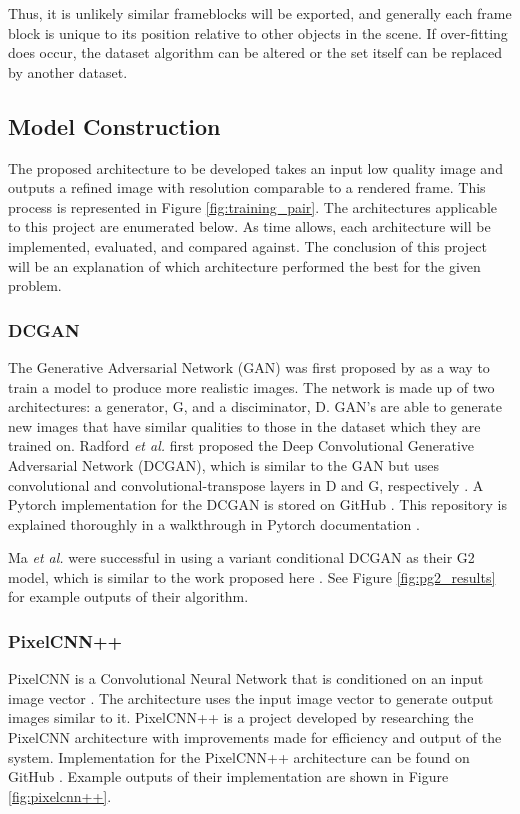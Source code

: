 \documentclass[letterpaper]{article} %
\begin{document}
Thus, it is unlikely similar frameblocks will be exported,
and generally each frame block is unique to its position relative to other objects in the scene.
If over-fitting does occur,
the dataset algorithm can be altered or the set itself can be replaced by another dataset.

\subsection{Model Construction}
\label{subsec:model}
The proposed architecture to be developed takes an input low quality image and outputs
a refined image with resolution comparable to a rendered frame.
This process is represented in Figure \ref{fig:training_pair}.
The architectures applicable to this project are enumerated below.
As time allows, each architecture will be implemented, evaluated, and compared
against. The conclusion of this project will be an explanation of which architecture performed the best
for the given problem.

\subsubsection{DCGAN}
The Generative Adversarial Network (GAN) was first proposed by
\cite{generative_adversarial_networks}
as a way to
train a model to produce more realistic images. The network is made up of two architectures:
a generator, G, and a disciminator, D.
GAN's are able to generate new images that have similar qualities to
those in the dataset which they are trained on.
Radford \textit{et al.} first proposed the Deep Convolutional Generative Adversarial Network (DCGAN),
which is similar to the GAN
but uses convolutional and convolutional-transpose layers in D and G, respectively
\cite{unsupervised_learning}.
A Pytorch implementation for the DCGAN is stored on GitHub
\cite{dcgan_git}. This repository is explained thoroughly in a walkthrough
in Pytorch documentation \cite{dcgan_example}.

Ma \textit{et al.} were successful in using
a variant conditional DCGAN as their G2 model, which is similar to the work proposed here
\cite{pose_guided_image_generation}.
See Figure \ref{fig:pg2_results} for example outputs of their algorithm.

\subsubsection{PixelCNN++}
PixelCNN is a Convolutional Neural Network that is conditioned on an input image vector
\cite{conditional_image_generation}.
The architecture uses the input image vector to generate output images similar to it.
PixelCNN++ \cite{pixelcnn++} is a project developed by researching the
PixelCNN architecture with improvements made
for efficiency and output of the system.
Implementation for the PixelCNN++ architecture can be found on GitHub \cite{pixelcnn++_git}.
Example outputs of their implementation are shown in Figure \ref{fig:pixelcnn++}.
\end{document}
